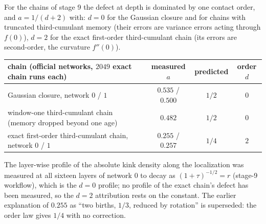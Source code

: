 \begin{conjecture}\label{conj:order}
For the chains of stage 9 the defect at depth is dominated by one contact order, and $a=1/(d+2)$ with: $d=0$ for the
Gaussian closure and for chains with truncated third-cumulant memory (their errors are variance errors acting through
$f(0)$), $d=2$ for the exact first-order third-cumulant chain (its errors are second-order, the curvature $f''(0)$).
\end{conjecture}
\begin{center}\small
\begin{tabular}{lccc}\toprule
chain (official networks, $2049$ exact chain runs each) & measured $a$ & predicted & order $d$\\\midrule
Gaussian closure, network $0$ / $1$ & $0.535$ / $0.500$ & $1/2$ & $0$\\
window-one third-cumulant chain (memory dropped beyond one age) & $0.482$ & $1/2$ & $0$\\
exact first-order third-cumulant chain, network $0$ / $1$ & $0.255$ / $0.257$ & $1/4$ & $2$\\\bottomrule
\end{tabular}
\end{center}
The layer-wise profile of the absolute kink density along the localization was measured at all sixteen layers of
network $0$ to decay as $(1+\tau)^{-1/2}=r$ (stage-9 workflow), which is the $d=0$ profile; no profile of the exact
chain's defect has been measured, so the $d=2$ attribution rests on the constant. The earlier explanation of
$0.255$ as ``two births, $1/3$, reduced by rotation'' is superseded: the order law gives $1/4$ with no correction.

